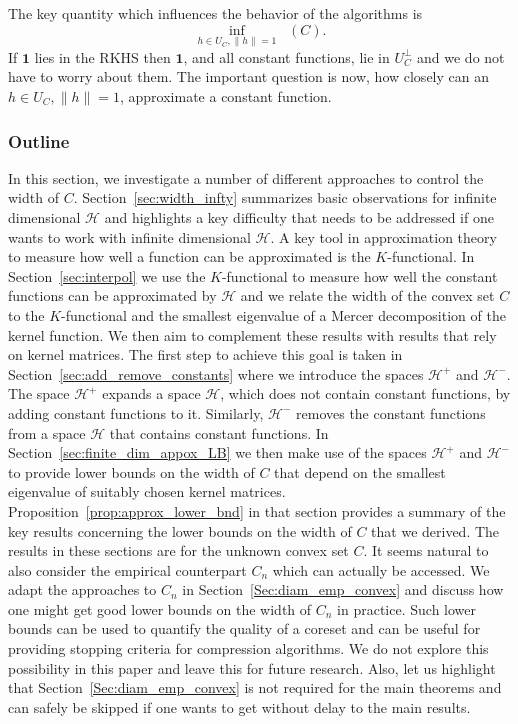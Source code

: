 \documentclass[AHL,Unicode,longabstracts,published]{cedram}
\theoremstyle{remark}
\DeclareMathOperator{\diamh}{{width}_h}
\newcommand{\cH}{\mathcal{H}}
\newcounter{setofstep}
\newcounter{step}[setofstep]
\begin{document}
The key quantity which influences the behavior of the algorithms is
\[
\inf_{h \in U_C, \|h\| =1} \diamh(C).
\]
If $\bm 1$ lies in the RKHS then $\bm 1$, and all constant functions, lie in $U_C^\perp$ and we do not have to worry about them. The important question is now, how closely can an $h \in U_C, \|h\| =1$, approximate a constant function.



\subsubsection{Outline} In this section, we investigate a number of different approaches to control the width of $C$. Section~\ref{sec:width_infty} summarizes basic observations for infinite dimensional $\cH$ and highlights a key difficulty that needs to be addressed if one wants to work with infinite dimensional $\cH$. A key tool in approximation theory to measure how well a function can be approximated is the $K$-functional. In Section~\ref{sec:interpol} we use the $K$-functional to measure how well the constant functions can be approximated by $\cH$ and we relate the width of the convex set $C$ to the $K$-functional and the smallest eigenvalue of a Mercer decomposition of the kernel function. We then aim to complement these results with results that rely on kernel matrices. The first step to achieve this goal is taken in Section~\ref{sec:add_remove_constants} where we introduce the spaces $\cH^+$ and $\cH^-$. The space $\cH^+$ expands a space $\cH$, which does not contain constant functions, by adding constant functions to it. Similarly, $\cH^-$ removes the constant functions from a space $\cH$ that contains constant functions. In Section~\ref{sec:finite_dim_appox_LB} we then make use of the spaces $\cH^+$ and $\cH^-$ to provide lower bounds on the width of $C$ that depend on the smallest eigenvalue of suitably chosen kernel matrices. Proposition~\ref{prop:approx_lower_bnd} in that section provides a summary of the key results concerning the lower bounds on the width of $C$ that we derived. The results in these sections are for the unknown convex set $C$. It seems natural to also consider the empirical counterpart $C_n$ which can actually be accessed. We adapt the approaches to $C_n$ in Section~\ref{Sec:diam_emp_convex} and discuss how one might get good lower bounds on the width of $C_n$ in practice. Such lower bounds can be used to quantify the quality of a coreset and can be useful for providing stopping criteria for compression algorithms. We do not explore this possibility in this paper and leave this for future research. Also, let us highlight that Section~\ref{Sec:diam_emp_convex} is not required for the main theorems and can safely be skipped if one wants to get without delay to the main results.
\end{document}
